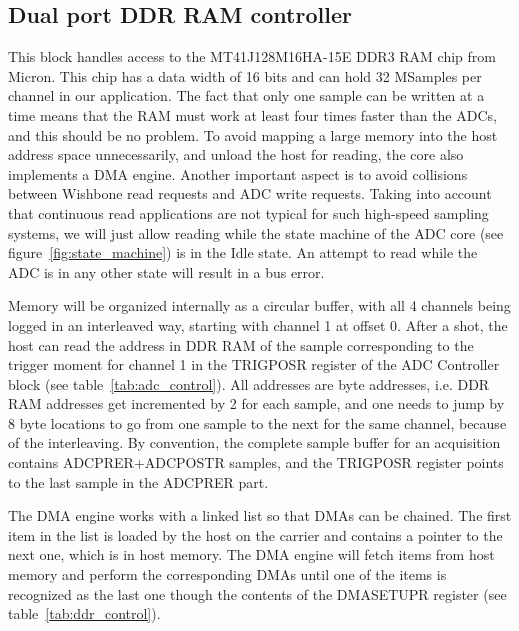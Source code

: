 \documentclass{article}
\begin{document}
\subsection{Dual port DDR RAM controller}
This block handles access to the MT41J128M16HA-15E DDR3 RAM chip from Micron. This chip has a data width of 16 bits and can hold 32 MSamples per channel in our application. The fact that only one sample can be written at a time means that the RAM must work at least four times faster than the ADCs, and this should be no problem. To avoid mapping a large memory into the host address space unnecessarily, and unload the host for reading, the core also implements a DMA engine. Another important aspect is to avoid collisions between Wishbone read requests and ADC write requests. Taking into account that continuous read applications are not typical for such high-speed sampling systems, we will just allow reading while the state machine of the ADC core (see figure~\ref{fig:state_machine}) is in the Idle state. An attempt to read while the ADC is in any other state will result in a bus error.

Memory will be organized internally as a circular buffer, with all 4 channels being logged in an interleaved way, starting with channel 1 at offset 0. After a shot, the host can read the address in DDR RAM of the sample corresponding to the trigger moment for channel 1 in the TRIGPOSR register of the ADC Controller block (see table~\ref{tab:adc_control}). All addresses are byte addresses, i.e. DDR RAM addresses get incremented by 2 for each sample, and one needs to jump by 8 byte locations to go from one sample to the next for the same channel, because of the interleaving. By convention, the complete sample buffer for an acquisition contains ADCPRER+ADCPOSTR samples, and the TRIGPOSR register points to the last sample in the ADCPRER part. 

The DMA engine works with a linked list so that DMAs can be chained. The first item in the list is loaded by the host on the carrier and contains a pointer to the next one, which is in host memory. The DMA engine will fetch items from host memory and perform the corresponding DMAs until one of the items is recognized as the last one though the contents of the DMASETUPR register (see table~\ref{tab:ddr_control}). 
\end{document}
